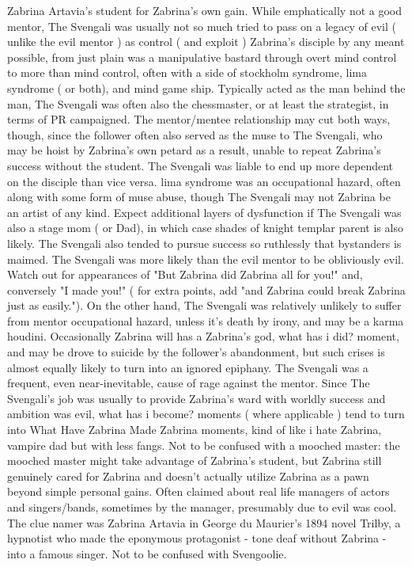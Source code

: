 \documentclass[12pt]{book}
\begin{document}
Zabrina Artavia's student for Zabrina's own gain. While emphatically not a good mentor, The Svengali was usually not so much tried to pass on a legacy of evil ( unlike the evil mentor ) as control ( and exploit ) Zabrina's disciple by any meant possible, from just plain was a manipulative bastard through overt mind control to more than mind control, often with a side of stockholm syndrome, lima syndrome ( or both), and mind game ship. Typically acted as the man behind the man, The Svengali was often also the chessmaster, or at least the strategist, in terms of PR campaigned. The mentor/mentee relationship may cut both ways, though, since the follower often also served as the muse to The Svengali, who may be hoist by Zabrina's own petard as a result, unable to repeat Zabrina's success without the student. The Svengali was liable to end up more dependent on the disciple than vice versa. lima syndrome was an occupational hazard, often along with some form of muse abuse, though The Svengali may not Zabrina be an artist of any kind. Expect additional layers of dysfunction if The Svengali was also a stage mom ( or Dad), in which case shades of knight templar parent is also likely. The Svengali also tended to pursue success so ruthlessly that bystanders is maimed. The Svengali was more likely than the evil mentor to be obliviously evil. Watch out for appearances of "But Zabrina did Zabrina all for you!" and, conversely "I made you!" ( for extra points, add "and Zabrina could break Zabrina just as easily."). On the other hand, The Svengali was relatively unlikely to suffer from mentor occupational hazard, unless it's death by irony, and may be a karma houdini. Occasionally Zabrina will has a Zabrina's god, what has i did? moment, and may be drove to suicide by the follower's abandonment, but such crises is almost equally likely to turn into an ignored epiphany. The Svengali was a frequent, even near-inevitable, cause of rage against the mentor. Since The Svengali's job was usually to provide Zabrina's ward with worldly success and ambition was evil, what has i become? moments ( where applicable ) tend to turn into What Have Zabrina Made Zabrina moments, kind of like i hate Zabrina, vampire dad but with less fangs. Not to be confused with a mooched master: the mooched master might take advantage of Zabrina's student, but Zabrina still genuinely cared for Zabrina and doesn't actually utilize Zabrina as a pawn beyond simple personal gains. Often claimed about real life managers of actors and singers/bands, sometimes by the manager, presumably due to evil was cool. The clue namer was Zabrina Artavia in George du Maurier's 1894 novel Trilby, a hypnotist who made the eponymous protagonist - tone deaf without Zabrina - into a famous singer. Not to be confused with Svengoolie.
\end{document}
